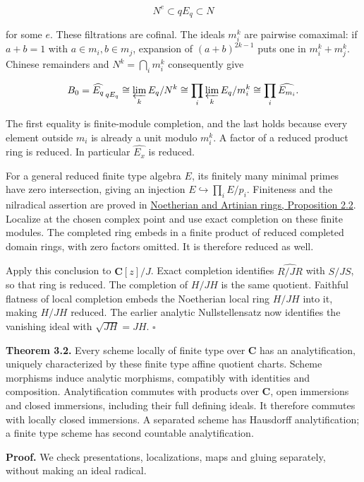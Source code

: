 \documentclass[11pt]{article}
\begin{document}
\[
N^e\subset qE_q\subset N
\]

for some \(e\). These filtrations are cofinal. The ideals \(m_i^k\) are
pairwise comaximal: if \(a+b=1\) with \(a\in m_i,b\in m_j\), expansion
of \((a+b)^{2k-1}\) puts one in \(m_i^k+m_j^k\). Chinese remainders and
\(N^k=\bigcap_i m_i^k\) consequently give

\[
B_0=\widehat{E_q}_{\,qE_q}
\cong\varprojlim_k E_q/N^k
\cong\prod_i\varprojlim_k E_q/m_i^k
\cong\prod_i\widehat{E_{m_i}}.
\]

The first equality is finite-module completion, and the last holds
because every element outside \(m_i\) is already a unit modulo
\(m_i^k\). A factor of a reduced product ring is reduced. In particular
\(\widehat{E_x}\) is reduced.

For a general reduced finite type algebra \(E\), its finitely many
minimal primes have zero intersection, giving an injection
\(E\hookrightarrow\prod_i E/p_i\). Finiteness and the nilradical
assertion are proved in
\href{../../AG-CA/AG-CA-03.html\#2-polynomial-rings-and-finite-geometric-descriptions}{Noetherian
and Artinian rings, Proposition 2.2}. Localize at the chosen complex
point and use exact completion on these finite modules. The completed
ring embeds in a finite product of reduced completed domain rings, with
zero factors omitted. It is therefore reduced as well.

Apply this conclusion to \(\mathbf C[z]/J\). Exact completion identifies
\(\widehat{R/JR}\) with \(S/JS\), so that ring is reduced. The
completion of \(H/JH\) is the same quotient. Faithful flatness of local
completion embeds the Noetherian local ring \(H/JH\) into it, making
\(H/JH\) reduced. The earlier analytic Nullstellensatz now identifies
the vanishing ideal with \(\sqrt{JH}=JH\). \(\square\)

\textbf{Theorem 3.2.} Every scheme locally of finite type over
\(\mathbf C\) has an analytification, uniquely characterized by these
finite type affine quotient charts. Scheme morphisms induce analytic
morphisms, compatibly with identities and composition. Analytification
commutes with products over \(\mathbf C\), open immersions and closed
immersions, including their full defining ideals. It therefore commutes
with locally closed immersions. A separated scheme has Hausdorff
analytification; a finite type scheme has second countable
analytification.

\textbf{Proof.} We check presentations, localizations, maps and gluing
separately, without making an ideal radical.
\end{document}
